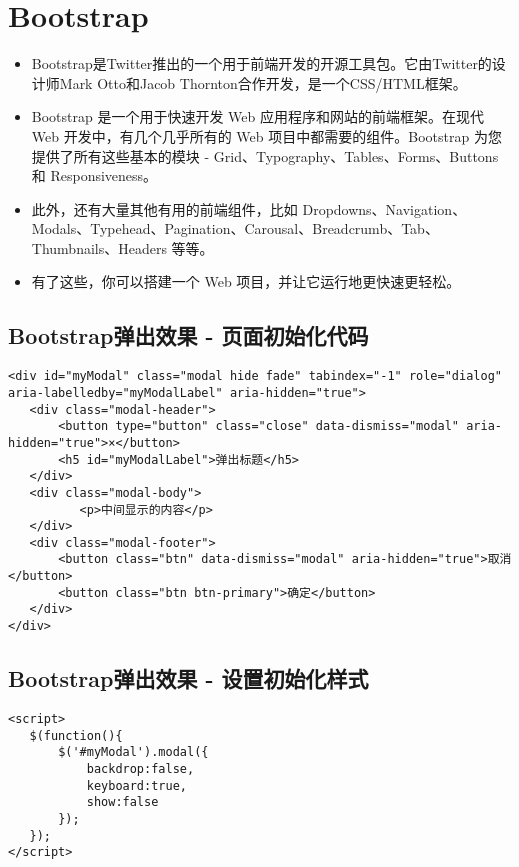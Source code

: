\documentclass[11pt]{article}
\begin{document}
\section*{Bootstrap}
\label{sec-2}

\begin{itemize}
\item Bootstrap是Twitter推出的一个用于前端开发的开源工具包。它由Twitter的设计师Mark Otto和Jacob Thornton合作开发，是一个CSS/HTML框架。

\item Bootstrap 是一个用于快速开发 Web 应用程序和网站的前端框架。在现代 Web 开发中，有几个几乎所有的 Web 项目中都需要的组件。Bootstrap 为您提供了所有这些基本的模块 - Grid、Typography、Tables、Forms、Buttons 和 Responsiveness。

\item 此外，还有大量其他有用的前端组件，比如 Dropdowns、Navigation、Modals、Typehead、Pagination、Carousal、Breadcrumb、Tab、Thumbnails、Headers 等等。

\item 有了这些，你可以搭建一个 Web 项目，并让它运行地更快速更轻松。
\end{itemize}


\subsection*{Bootstrap弹出效果 - 页面初始化代码}
\label{sec-2-1}
\begin{verbatim}
<div id="myModal" class="modal hide fade" tabindex="-1" role="dialog" aria-labelledby="myModalLabel" aria-hidden="true">
   <div class="modal-header">
       <button type="button" class="close" data-dismiss="modal" aria-hidden="true">×</button>
       <h5 id="myModalLabel">弹出标题</h5>
   </div>
   <div class="modal-body">
          <p>中间显示的内容</p>
   </div>
   <div class="modal-footer">
       <button class="btn" data-dismiss="modal" aria-hidden="true">取消</button>
       <button class="btn btn-primary">确定</button>
   </div>
</div>
\end{verbatim}

\subsection*{Bootstrap弹出效果 - 设置初始化样式}
\label{sec-2-2}

\begin{verbatim}
<script>
   $(function(){
       $('#myModal').modal({
           backdrop:false,
           keyboard:true,
           show:false
       });
   });
</script>
\end{verbatim}
\end{document}

